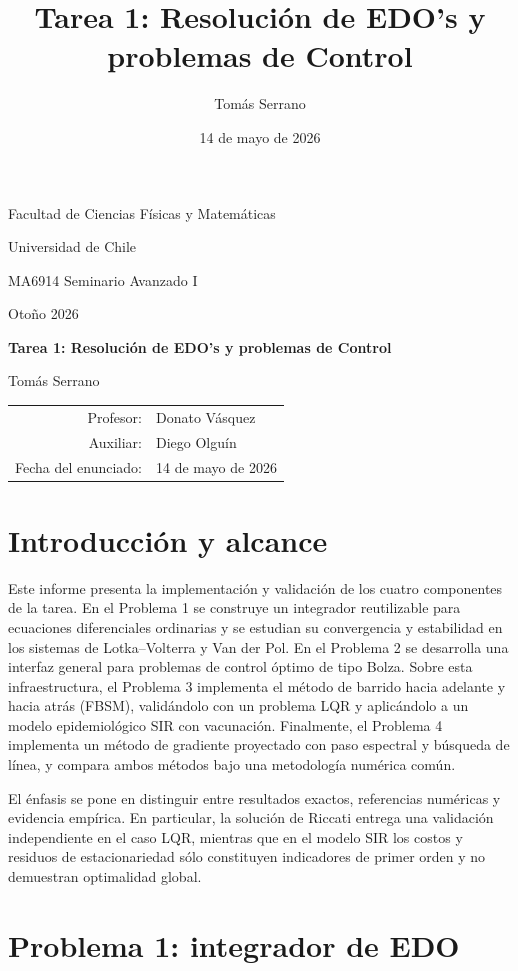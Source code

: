 \documentclass[11pt,a4paper]{article}
\title{\textbf{Tarea 1: Resolución de EDO's y problemas de Control}}
\author{Tomás Serrano}
\date{14 de mayo de 2026}
\begin{document}
\begin{titlepage}
    \centering
    {\large Facultad de Ciencias Físicas y Matemáticas\par}
    {\large Universidad de Chile\par}
    \vspace{1.5cm}
    {\Large MA6914 Seminario Avanzado I\par}
    {\large Otoño 2026\par}
    \vfill
    {\LARGE\bfseries Tarea 1: Resolución de EDO's y problemas de Control\par}
    \vspace{1.5cm}
    {\large Tomás Serrano\par}
    \vfill
    \begin{tabular}{rl}
        Profesor: & Donato Vásquez \\
        Auxiliar: & Diego Olguín \\
        Fecha del enunciado: & 14 de mayo de 2026
    \end{tabular}
    \vfill
\end{titlepage}

\section{Introducción y alcance}

Este informe presenta la implementación y validación de los cuatro componentes de la tarea. En el Problema 1 se construye un integrador reutilizable para ecuaciones diferenciales ordinarias y se estudian su convergencia y estabilidad en los sistemas de Lotka--Volterra y Van der Pol. En el Problema 2 se desarrolla una interfaz general para problemas de control óptimo de tipo Bolza. Sobre esta infraestructura, el Problema 3 implementa el método de barrido hacia adelante y hacia atrás (FBSM), validándolo con un problema LQR y aplicándolo a un modelo epidemiológico SIR con vacunación. Finalmente, el Problema 4 implementa un método de gradiente proyectado con paso espectral y búsqueda de línea, y compara ambos métodos bajo una metodología numérica común.

El énfasis se pone en distinguir entre resultados exactos, referencias numéricas y evidencia empírica. En particular, la solución de Riccati entrega una validación independiente en el caso LQR, mientras que en el modelo SIR los costos y residuos de estacionariedad sólo constituyen indicadores de primer orden y no demuestran optimalidad global.

\section{Problema 1: integrador de EDO}
\end{document}
